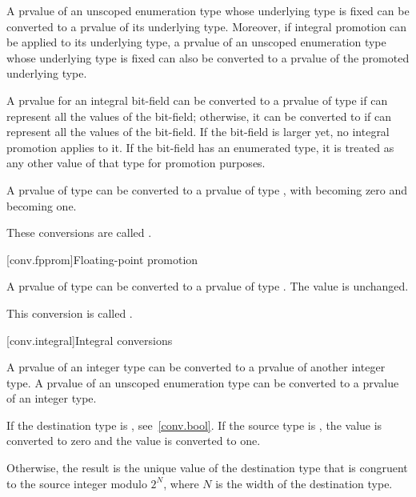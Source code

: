 \pnum
A prvalue of an unscoped enumeration type whose underlying type is
fixed can be converted to a prvalue of its underlying type. Moreover,
if integral promotion can be applied to its underlying type, a prvalue of an unscoped
enumeration type whose underlying type is fixed can also be converted to a prvalue of
the promoted underlying type.

\pnum
A prvalue for an integral bit-field can be converted
to a prvalue of type  if  can represent all the
values of the bit-field; otherwise, it can be converted to
 if  can represent all the
values of the bit-field. If the bit-field is larger yet, no integral
promotion applies to it. If the bit-field has an enumerated type, it is
treated as any other value of that type for promotion purposes.

\pnum
{}%
A prvalue of type  can be converted to a prvalue of type
, with  becoming zero and  becoming
one.

\pnum
These conversions are called .

[conv.fpprom]{Floating-point promotion}

\pnum
{}%
A prvalue of type  can be converted to a prvalue of type
. The value is unchanged.

\pnum
This conversion is called .

[conv.integral]{Integral conversions}

\pnum
{}%
A prvalue of an integer type can be converted to a prvalue of another
integer type. A prvalue of an unscoped enumeration type can be converted to
a prvalue of an integer type.

\pnum
{}%
If the destination type is , see~\ref{conv.bool}. If the
source type is , the value  is converted to
zero and the value  is converted to one.

\pnum
{}%
%
Otherwise, the result is the unique value of the destination type
that is congruent to the source integer modulo $2^N$,
where $N$ is the width of the destination type.


